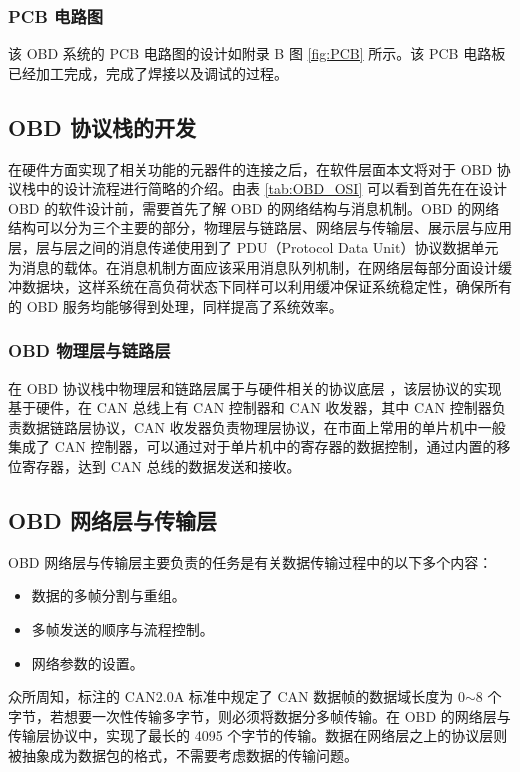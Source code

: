 \subsubsection{PCB 电路图}
该 OBD 系统的 PCB 电路图的设计如附录 B 图 \ref{fig:PCB} 所示。该 PCB 电路板已经加工完成，完成了焊接以及调试的过程。

\subsection{OBD 协议栈的开发}
在硬件方面实现了相关功能的元器件的连接之后，在软件层面本文将对于 OBD 协议栈中的设计流程进行简略的介绍。由表 \ref{tab:OBD_OSI} 可以看到首先在在设计 OBD 的软件设计前，需要首先了解 OBD 的网络结构与消息机制。OBD 的网络结构可以分为三个主要的部分，物理层与链路层、网络层与传输层、展示层与应用层，层与层之间的消息传递使用到了 PDU（Protocol Data Unit）协议数据单元为消息的载体。在消息机制方面应该采用消息队列机制，在网络层每部分面设计缓冲数据块，这样系统在高负荷状态下同样可以利用缓冲保证系统稳定性，确保所有的 OBD 服务均能够得到处理，同样提高了系统效率。

\subsubsection{OBD 物理层与链路层}
在 OBD 协议栈中物理层和链路层属于与硬件相关的协议底层 \cite{Zheng2008A}，该层协议的实现基于硬件，在 CAN 总线上有 CAN 控制器和 CAN 收发器，其中 CAN 控制器负责数据链路层协议，CAN 收发器负责物理层协议，在市面上常用的单片机中一般集成了 CAN 控制器，可以通过对于单片机中的寄存器的数据控制，通过内置的移位寄存器，达到 CAN 总线的数据发送和接收。

\subsection{OBD 网络层与传输层}
OBD 网络层与传输层主要负责的任务是有关数据传输过程中的以下多个内容：

\begin{itemize}
	\item 数据的多帧分割与重组。
	\item 多帧发送的顺序与流程控制。
	\item 网络参数的设置。
\end{itemize}

众所周知，标注的 CAN2.0A 标准中规定了 CAN 数据帧的数据域长度为 0$\sim$8 个字节，若想要一次性传输多字节，则必须将数据分多帧传输。在 OBD 的网络层与传输层协议中，实现了最长的 4095 个字节的传输。数据在网络层之上的协议层则被抽象成为数据包的格式，不需要考虑数据的传输问题。

